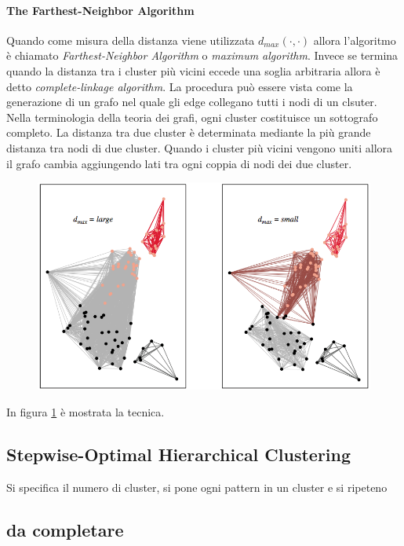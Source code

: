 \paragraph{The Farthest-Neighbor Algorithm}
Quando come misura della distanza viene utilizzata $d_{max}(\cdot, \cdot)$ allora l'algoritmo è chiamato \emph{Farthest-Neighbor Algorithm} o \emph{maximum algorithm}. Invece se termina quando la distanza tra i cluster più vicini eccede una soglia arbitraria allora è detto \emph{complete-linkage algorithm}. La procedura può essere vista come la generazione di un grafo nel quale gli edge collegano tutti i nodi di un clsuter. Nella terminologia della teoria dei grafi, ogni cluster costituisce un sottografo completo. La distanza tra due cluster è determinata mediante la più grande distanza tra nodi di due cluster. Quando i cluster più vicini vengono uniti allora il grafo cambia aggiungendo lati tra ogni coppia di nodi dei due cluster. 
\begin{figure}
\centering
\includegraphics[scale=0.4]{img/grafo2.png}
\caption{}
\label{grafo2}
\end{figure}
In figura \ref{grafo2} è mostrata la tecnica. 

\subsection{Stepwise-Optimal Hierarchical Clustering}
Si specifica il numero di cluster, si pone ogni pattern in un cluster e si ripeteno
\subsection{da completare}

%
